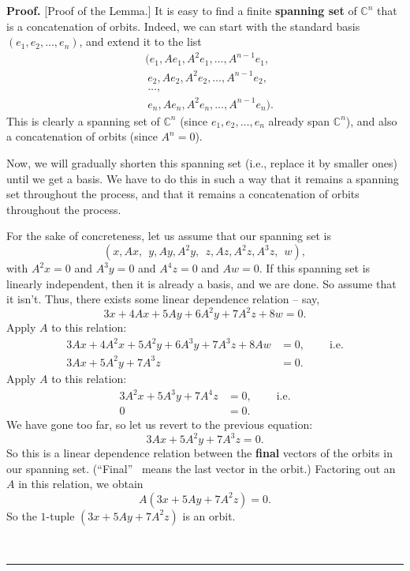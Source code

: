 \documentclass[numbers=enddot,12pt,final,onecolumn,notitlepage]{scrartcl}%
\numberwithin{exer}{subsection}
\theoremstyle{definition}
\newenvironment{proof}[1][Proof]{\noindent\textbf{#1.} }{\ \rule{0.5em}{0.5em}}
\begin{document}
\begin{proof}
[Proof of the Lemma.] It is easy to find a finite \textbf{spanning set} of
$\mathbb{C}^{n}$ that is a concatenation of orbits. Indeed, we can start with
the standard basis $\left(  e_{1},e_{2},\ldots,e_{n}\right)  $, and extend it
to the list%
\begin{align*}
& (e_{1},Ae_{1},A^{2}e_{1},\ldots,A^{n-1}e_{1},\\
& \ e_{2},Ae_{2},A^{2}e_{2},\ldots,A^{n-1}e_{2},\\
& \ \ldots,\\
& \ e_{n},Ae_{n},A^{2}e_{n},\ldots,A^{n-1}e_{n}).
\end{align*}
This is clearly a spanning set of $\mathbb{C}^{n}$ (since $e_{1},e_{2}%
,\ldots,e_{n}$ already span $\mathbb{C}^{n}$), and also a concatenation of
orbits (since $A^{n}=0$).

Now, we will gradually shorten this spanning set (i.e., replace it by smaller
ones) until we get a basis. We have to do this in such a way that it remains a
spanning set throughout the process, and that it remains a concatenation of
orbits throughout the process.

For the sake of concreteness, let us assume that our spanning set is%
\[
\left(  x,Ax,\ \ y,Ay,A^{2}y,\ \ z,Az,A^{2}z,A^{3}z,\ \ w\right)  ,
\]
with $A^{2}x=0$ and $A^{3}y=0$ and $A^{4}z=0$ and $Aw=0$. If this spanning set
is linearly independent, then it is already a basis, and we are done. So
assume that it isn't. Thus, there exists some linear dependence relation --
say,%
\[
3x+4Ax+5Ay+6A^{2}y+7A^{2}z+8w=0.
\]
Apply $A$ to this relation:%
\begin{align*}
3Ax+4A^{2}x+5A^{2}y+6A^{3}y+7A^{3}z+8Aw  & =0,\ \ \ \ \ \ \ \ \ \ \text{i.e.}%
\\
3Ax+5A^{2}y+7A^{3}z  & =0.
\end{align*}
Apply $A$ to this relation:%
\begin{align*}
3A^{2}x+5A^{3}y+7A^{4}z  & =0,\ \ \ \ \ \ \ \ \ \ \text{i.e.}\\
0  & =0.
\end{align*}
We have gone too far, so let us revert to the previous equation:%
\[
3Ax+5A^{2}y+7A^{3}z=0.
\]
So this is a linear dependence relation between the \textbf{final} vectors of
the orbits in our spanning set. (\textquotedblleft Final\textquotedblright%
\ means the last vector in the orbit.) Factoring out an $A$ in this relation,
we obtain%
\[
A\left(  3x+5Ay+7A^{2}z\right)  =0.
\]
So the $1$-tuple $\left(  3x+5Ay+7A^{2}z\right)  $ is an orbit.


\end{proof}
\end{document}
